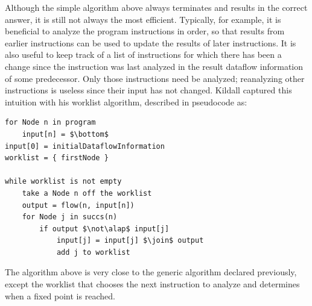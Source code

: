 \documentclass[11pt]{article}
\begin{document}
Although the simple algorithm above always terminates and results in the correct
answer, it is still not always the most efficient.  Typically, for example, it
is beneficial to analyze the program instructions in order, so that results from
earlier instructions can be used to update the results of later instructions.
It is also useful to keep track of a list of instructions for which there has
been a change since the instruction was last analyzed in the result dataflow
information of some predecessor.  Only those instructions need be analyzed;
reanalyzing other instructions is useless since their input has not
changed. Kildall captured this intuition with his worklist algorithm, described
in pseudocode as:

%
%




\begin{lstlisting}[mathescape]
for Node n in program
    input[n] = $\bottom$
input[0] = initialDataflowInformation
worklist = { firstNode }

while worklist is not empty
    take a Node n off the worklist
    output = flow(n, input[n])
	for Node j in succs(n)
		if output $\not\alap$ input[j]
			input[j] = input[j] $\join$ output
			add j to worklist
\end{lstlisting}

\noindent The algorithm above is very close to the generic algorithm declared
previously, except the worklist that chooses the next instruction to analyze
and determines when a fixed point is reached.
\end{document}
